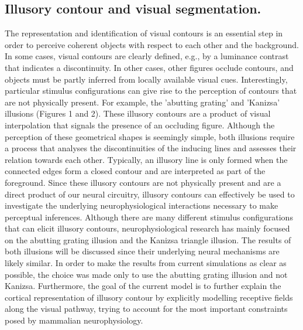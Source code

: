 \documentclass[12pt]{article}
\begin{document}
\subsection{Illusory contour and visual segmentation.}
The representation and identification of visual contours is an essential step in order to perceive coherent objects with respect to each other and the background.
In some cases, visual contours are clearly defined, e.g., by a luminance contrast that indicates a discontinuity. In other cases, other figures occlude contours, 
and objects must be partly inferred from locally available visual cues. Interestingly, particular stimulus configurations can give rise to the perception of contours 
that are not physically present. For example, the 'abutting grating' and 'Kanizsa' illusions (Figures 1 and 2). These illusory contours are a product of visual interpolation that signals the presence of an occluding figure. Although the perception of these geometrical shapes is seemingly simple, both illusions require a process that analyses the discontinuities of the inducing lines and assesses their relation towards each other. Typically, an illusory line is only formed when the connected edges form a closed contour and are interpreted as part of the foreground. Since these illusory contours are not physically present and are a direct product of our neural circuitry, illusory contours can  effectively be used to investigate the underlying neurophysiological interactions necessary to make perceptual inferences. Although there are many different stimulus configurations  that can elicit illusory contours, neurophysiological research has mainly focused on the abutting grating illusion and the Kanizsa triangle illusion. The results of both illusions will be discussed since their underlying neural mechanisms are likely similar. In order to make the results from current simulations as clear as possible, the choice was made only to use the abutting grating illusion and not Kanizsa. Furthermore, the goal of the current model is to further explain the cortical representation of illusory contour by explicitly modelling receptive fields along the visual pathway, trying to account for the most important constraints posed by mammalian neurophysiology.

\bigbreak
\end{document}
